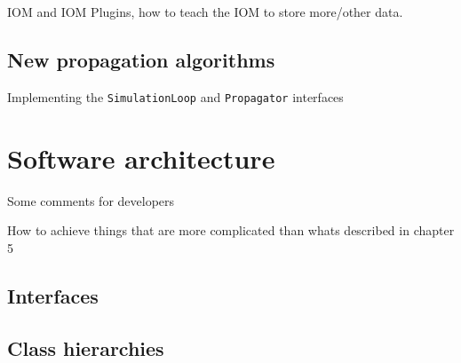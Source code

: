 \documentclass[a4paper,10pt]{report}
\begin{document}
IOM and IOM Plugins, how to teach the IOM to store more/other data.

\section{New propagation algorithms}

Implementing the \texttt{SimulationLoop} and \texttt{Propagator} interfaces



\chapter{Software architecture}

Some comments for developers

How to achieve things that are more complicated than whats
described in chapter 5

\section{Interfaces}

\section{Class hierarchies}
\end{document}
